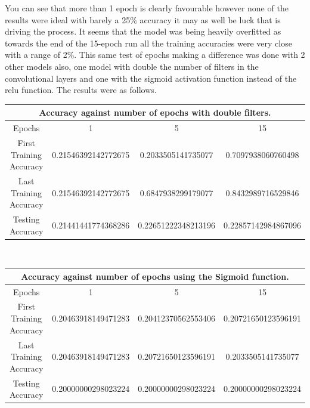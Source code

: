 You can see that more than 1 epoch is clearly favourable however none of the results were ideal with barely a 25\% accuracy it may as well be luck that is driving the process. It seems that the model was being heavily overfitted as towards the end of the 15-epoch run all the training accuracies were very close with a range of 2\%. This same test of epochs making a difference was done with 2 other models also, one model with double the number of filters in the convolutional layers and one with the sigmoid activation function instead of the relu function. The results were as follows. \\

\begin{table}[H]
\begin{center}
 \footnotesize
 \begin{tabular}{|c||c|c|c|}
 \hline
 \multicolumn{4}{|c|}{Accuracy against number of epochs with double filters.} \\
 \hline
 Epochs & 1 & 5 & 15 \\
 \hline \hline
 First Training Accuracy & 0.21546392142772675 &	0.2033505141735077 & 0.7097938060760498 \\
 \hline
 Last Training Accuracy & 0.21546392142772675 &	0.6847938299179077 & 0.8432989716529846 \\
 \hline
 Testing Accuracy & 0.21441441774368286	& 0.22651222348213196	& 0.22857142984867096 \\
 \hline
 \end{tabular} \\
\end{center}
\end{table}

\begin{table}[H]
\begin{center}
 \footnotesize
 \begin{tabular}{|c||c|c|c|}
 \hline
 \multicolumn{4}{|c|}{Accuracy against number of epochs using the Sigmoid function.} \\
 \hline
 Epochs & 1 & 5 & 15 \\
 \hline \hline
 First Training Accuracy & 0.20463918149471283 & 0.20412370562553406	& 0.20721650123596191 \\
 \hline
 Last Training Accuracy & 0.20463918149471283 &	0.20721650123596191 & 0.2033505141735077 \\
 \hline
 Testing Accuracy & 0.20000000298023224	& 0.20000000298023224 & 0.20000000298023224 \\
 \hline
 \end{tabular} \\
\end{center}
\end{table}

